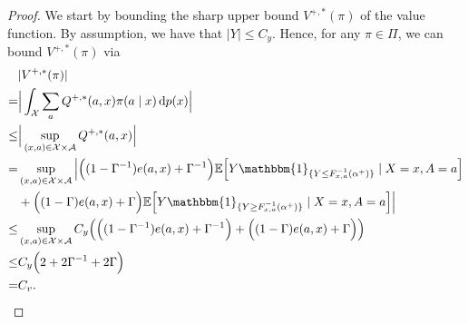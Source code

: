 \documentclass{article} %
\theoremstyle{plain}
\theoremstyle{definition}
\theoremstyle{remark}
\newcommand*\diff{\mathop{}\!\mathrm{d}}
\newcommand{\q}{F_{x,a}^{-1}}
\newcommand{\Indl}{\mathbbm{1}_{\{Y\leq \q({\alpha^+})\}}}
\newcommand{\Indg}{\mathbbm{1}_{\{Y\geq \q({\alpha^+})\}}}
\begin{document}
\begin{proof}
We start by bounding the sharp upper bound $V^{+,*}(\pi)$ of the value function. By assumption, we have that $|Y|\leq C_y$. Hence, for any $\pi \in \Pi$, we can bound $V^{+,*}(\pi)$ via
\begin{align}
    &|V^{+,*}(\pi)|\\
    =& \Big| \int_\mathcal{X} \sum_a Q^{+,*}(a,x) \pi(a\mid x)\diff p(x) \Big|\\
    \leq& \Big|\sup_{(x,a)\in \mathcal{X}\times \mathcal{A}} Q^{+,*}(a,x) \Big| \\
    =& \sup_{(x,a)\in \mathcal{X}\times \mathcal{A}} \Big| \Big( (1-\Gamma^{-1}) e(a, x) +\Gamma^{-1} \Big) \mathbb{E}\Big[ Y \Indl \mid X=x, A=a \Big]\\
        &+ \Big( (1-\Gamma) e(a, x) +\Gamma \Big) \mathbb{E}\Big[ Y \Indg \mid X=x, A=a \Big]  \Big|\\
    \leq& \sup_{(x,a)\in \mathcal{X}\times \mathcal{A}} C_y \Big(  \Big( (1-\Gamma^{-1}) e(a, x) +\Gamma^{-1} \Big) 
        + \Big( (1-\Gamma) e(a, x) +\Gamma \Big)    \Big) \\
    \leq& C_y \Big(2+ 2\Gamma^{-1}+2\Gamma\Big)\\
    =& C_v.
\end{align}


\end{proof}
\end{document}
